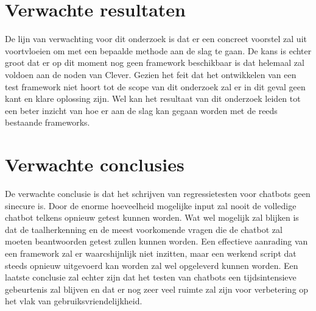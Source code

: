 \section{Verwachte resultaten}
\label{sec:verwachte_resultaten}

De lijn van verwachting voor dit onderzoek is dat er een concreet voorstel zal uit voortvloeien om met een bepaalde methode aan de slag te gaan. De kans is echter groot dat er op dit moment nog geen framework beschikbaar is dat helemaal zal voldoen aan de noden van Clever. Gezien het feit dat het ontwikkelen van een test framework niet hoort tot de scope van dit onderzoek zal er in dit geval geen kant en klare oplossing zijn. Wel kan het resultaat van dit onderzoek leiden tot een beter inzicht van hoe er aan de slag kan gegaan worden met de reeds bestaande frameworks.

\section{Verwachte conclusies}
\label{sec:verwachte_conclusies}

De verwachte conclusie is dat het schrijven van regressietesten voor chatbots geen sinecure is. Door de enorme hoeveelheid mogelijke input zal nooit de volledige chatbot telkens opnieuw getest kunnen worden. Wat wel mogelijk zal blijken is dat de taalherkenning en de meest voorkomende vragen die de chatbot zal moeten beantwoorden getest zullen kunnen worden. Een effectieve aanrading van een framework zal er waarcshijnlijk niet inzitten, maar een werkend script dat steeds opnieuw uitgevoerd kan worden zal wel opgeleverd kunnen worden. Een laatste conclusie zal echter zijn dat het testen van chatbots een tijdsintensieve gebeurtenis zal blijven en dat er nog zeer veel ruimte zal zijn voor verbetering op het vlak van gebruiksvriendelijkheid.

